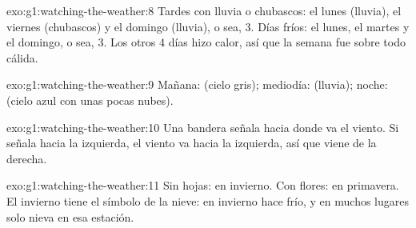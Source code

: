 \begin{solution}{exo:g1:watching-the-weather:8}
Tardes con lluvia o chubascos: el lunes (lluvia), el viernes (chubascos) y el domingo
(lluvia), o sea, 3. Días fríos: el lunes, el martes y el domingo, o sea, 3.
Los otros 4 días hizo calor, así que la semana fue sobre todo cálida.
\end{solution}

\begin{solution}{exo:g1:watching-the-weather:9}
Mañana:  (cielo gris); mediodía:  (lluvia);
noche:  (cielo azul con unas pocas nubes).
\end{solution}

\begin{solution}{exo:g1:watching-the-weather:10}
Una bandera señala hacia donde va el viento. Si señala hacia la izquierda,
el viento va hacia la izquierda, así que viene de la derecha.
\end{solution}

\begin{solution}{exo:g1:watching-the-weather:11}
Sin hojas: en invierno. Con flores: en primavera. El invierno tiene el
símbolo de la nieve: en invierno hace frío, y en muchos lugares solo nieva
en esa estación.
\end{solution}
